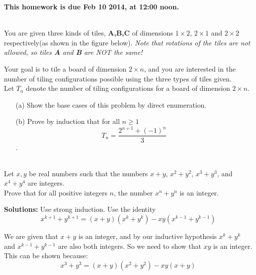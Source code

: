 \documentclass[11pt]{article}
\newif\ifsolutions
\begin{document}
\maketitle

\vspace{0.5em}
{\Large{\textbf{This homework is due Feb 10 2014, at 12:00 noon.}}}



\begin{qunlist}

 \\
You are given three kinds of tiles, \textbf{A,B,C} of dimensions $1 \times 2$, $2 \times 1$
and $2 \times 2$ respectively(as shown in the figure below).
\textit{Note that rotations of the tiles are not allowed, so tiles \textbf{A} and \textbf{B} are NOT the same!}

\begin{figure}[tile]
\centering
\end{figure}

Your goal is to tile a board of dimension $2 \times n$, and you are interested in the number of
tiling configurations possible using the three types of tiles given. \\
Let $T_n$ denote the number of tiling configurations for a board of dimension $2 \times n$.
\begin{itemize}
\item[(a)] Show the base cases of this problem by direct enumeration.

\ifsolutions
\textbf{Solutions:}
\fi


\item[(b)] Prove by induction that for all $n \geq 1$
\[ T_n = \frac{2^{n+1}+(-1)^n}{3} \]. 

\ifsolutions
\textbf{Solutions:}
\fi

\end{itemize}



 \\
Let $x,y$ be real numbers such that the numbers $x+y$, $x^2+y^2$, $x^3+y^3$, and $x^4+y^4$ are integers. \\ 
Prove that for all positive integers $n$, the number $x^n + y^n$ is an integer.

\ifsolutions
\textbf{Solutions:}
Use strong induction. Use the identity
\[ x^{k+1} + y^{k+1} = (x+y)(x^k + y^k) - xy(x^{k-1} + y^{k-1}) \]

We are given that $x+y$ is an integer, and by our inductive hypothesis $x^k + y^k$ and $x^{k-1} + y^{k-1}$ 
are also both integers. So we need to show that $xy$ is an integer.  This can be shown because:
\[ x^3 + y^3 = (x+y)(x^2+y^2) - xy(x+y) \]


\end{qunlist}
\end{document}
